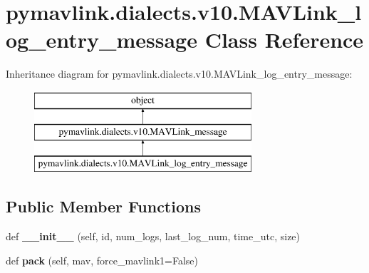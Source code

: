 \hypertarget{classpymavlink_1_1dialects_1_1v10_1_1MAVLink__log__entry__message}{}\section{pymavlink.\+dialects.\+v10.\+M\+A\+V\+Link\+\_\+log\+\_\+entry\+\_\+message Class Reference}
\label{classpymavlink_1_1dialects_1_1v10_1_1MAVLink__log__entry__message}
Inheritance diagram for pymavlink.\+dialects.\+v10.\+M\+A\+V\+Link\+\_\+log\+\_\+entry\+\_\+message\+:\begin{figure}[H]
\begin{center}
\leavevmode
\includegraphics[height=3.000000cm]{classpymavlink_1_1dialects_1_1v10_1_1MAVLink__log__entry__message}
\end{center}
\end{figure}
\subsection*{Public Member Functions}
\begin{DoxyCompactItemize}
\item 
\mbox{\label{classpymavlink_1_1dialects_1_1v10_1_1MAVLink__log__entry__message_aaf60aac6fcfc6041cd4fdca819b14e40}} 
def {\bfseries \+\_\+\+\_\+init\+\_\+\+\_\+} (self, id, num\+\_\+logs, last\+\_\+log\+\_\+num, time\+\_\+utc, size)
\item 
\mbox{\label{classpymavlink_1_1dialects_1_1v10_1_1MAVLink__log__entry__message_aa49df9c3dae314f619ec774cc32e9400}} 
def {\bfseries pack} (self, mav, force\+\_\+mavlink1=False)
\end{DoxyCompactItemize}
